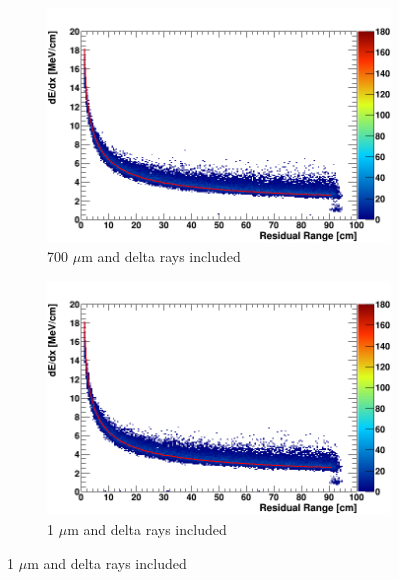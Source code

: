 \begin{figure}[t!]
        \begin{subfigure}[b]{0.495\textwidth}   
            \centering 
            \includegraphics[width=\textwidth]{derr_proton_delta_700um}
            \caption{700 $\mu$m and delta rays included}%
            \label{fig:derr_proton_delta_700}
        \end{subfigure}
        \hfill
        \begin{subfigure}[b]{0.495\textwidth}   
            \centering 
            \includegraphics[width=\textwidth]{derr_proton_delta_1um}
            \caption{1 $\mu$m and delta rays included}%

\end{subfigure}
\end{figure}
